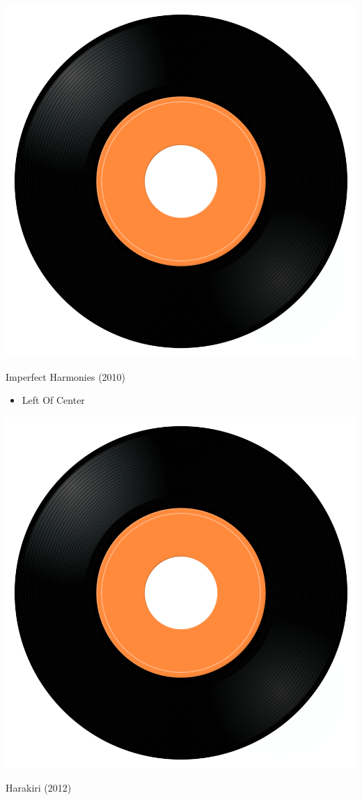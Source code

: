 \begin{minipage}[t]{0.25\textwidth}
\captionsetup{type=figure}
\includegraphics[width=\textwidth]{Images/cover.png}
\caption*{Imperfect Harmonies (2010)}
\end{minipage}
\begin{minipage}[t]{0.25\textwidth}\vspace{0pt}
\begin{itemize}[nosep,leftmargin=1em,labelwidth=*,align=left]
	\setlength{\itemsep}{0pt}
	\item Left Of Center
\end{itemize}
\end{minipage}
\begin{minipage}[t]{0.25\textwidth}
\captionsetup{type=figure}
\includegraphics[width=\textwidth]{Images/cover.png}
\caption*{Harakiri (2012)}
\end{minipage}
